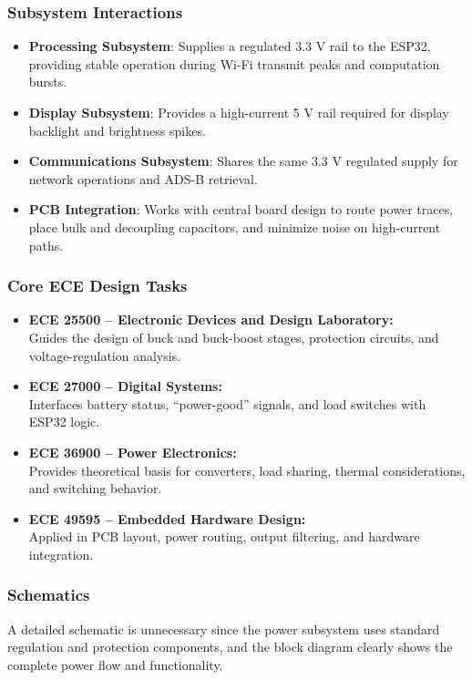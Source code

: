 \subsubsection{Subsystem Interactions}
\begin{itemize}
    \item \textbf{Processing Subsystem}: Supplies a regulated 3.3 V rail to the ESP32, providing stable operation during Wi-Fi transmit peaks and computation bursts.
    \item \textbf{Display Subsystem}: Provides a high-current 5 V rail required for display backlight and brightness spikes.
    \item \textbf{Communications Subsystem}: Shares the same 3.3 V regulated supply for network operations and ADS-B retrieval.
    \item \textbf{PCB Integration}: Works with central board design to route power traces, place bulk and decoupling capacitors, and minimize noise on high-current paths.
\end{itemize}

\subsubsection{Core ECE Design Tasks}
\begin{itemize}
    \item \textbf{ECE 25500 – Electronic Devices and Design Laboratory:}\\
          Guides the design of buck and buck-boost stages, protection circuits, and voltage-regulation analysis.
    \item \textbf{ECE 27000 – Digital Systems:}\\
          Interfaces battery status, “power-good” signals, and load switches with ESP32 logic.
    \item \textbf{ECE 36900 – Power Electronics:}\\
          Provides theoretical basis for converters, load sharing, thermal considerations, and switching behavior.
    \item \textbf{ECE 49595 – Embedded Hardware Design:}\\
          Applied in PCB layout, power routing, output filtering, and hardware integration.
\end{itemize}

\subsubsection{Schematics}
A detailed schematic is unnecessary since the power subsystem uses standard regulation and protection components, and the block diagram clearly shows the complete power flow and functionality.

